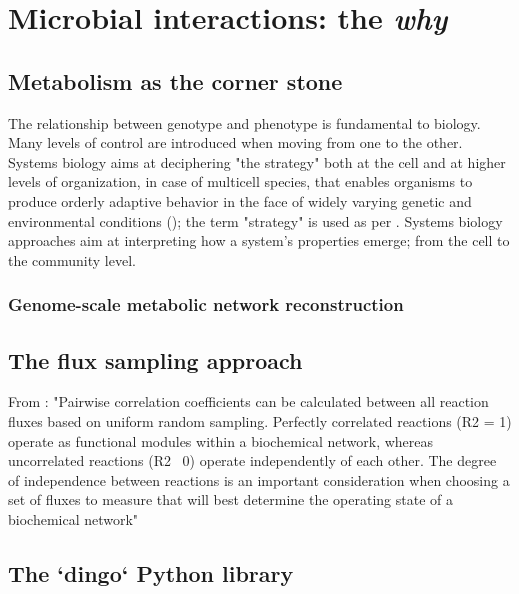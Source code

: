\chapter{Microbial interactions: the \textit{why}}
\label{cha:4}


\section{Metabolism as the corner stone}

The relationship between genotype and phenotype is fundamental to biology.
Many levels of control are introduced when moving from one to the other. 
Systems biology aims at deciphering "the strategy" both at the cell and at higher levels of organization, in case of multicell species, that enables organisms to produce orderly adaptive behavior in the face of widely varying genetic and environmental conditions (\cite{strohman2002maneuvering}); the term "strategy" is used as per \cite{polanyi1968life}.
Systems biology approaches aim at interpreting how a system's properties emerge; from the cell to the community level.


\subsection{Genome-scale metabolic network reconstruction}




\section{The flux sampling approach}

From \citet{price2004genome} :
"Pairwise correlation coefficients can be calculated
between all reaction fluxes based on uniform random
sampling. Perfectly correlated reactions (R2 = 1) operate
as functional modules within a biochemical network,
whereas uncorrelated reactions (R2 ~0) operate independently of each other. The degree of independence
between reactions is an important consideration when
choosing a set of fluxes to measure that will best determine the operating state of a biochemical network"

\citeauthor{polanyi1968life}

\section{The `dingo` Python library}


